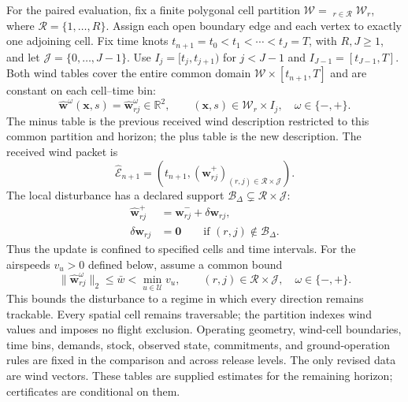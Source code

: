 For the paired evaluation, fix a finite polygonal cell partition
$\mathcal W=\mathop{\dot\bigcup}_{r\in\mathcal R}\mathcal W_r$, where
$\mathcal R=\{1,\ldots,R\}$. Assign each open boundary edge and each vertex
to exactly one adjoining cell. Fix time knots
$t_{n+1}=t_0<t_1<\cdots<t_J=T$, with $R,J\ge1$,
and let $\mathcal J=\{0,\ldots,J-1\}$.
Use $I_j=[t_j,t_{j+1})$ for $j<J-1$ and
$I_{J-1}=[t_{J-1},T]$. Both wind tables cover the entire common domain
$\mathcal W\times[t_{n+1},T]$ and are constant on each cell--time bin:
\begin{equation}
\widehat{\mathbf w}^{\omega}(\mathbf x,s)
=\widehat{\mathbf w}_{rj}^{\omega}\in\mathbb R^2,\qquad
(\mathbf x,s)\in\mathcal W_r\times I_j,\quad \omega\in\{-,+\}.
\label{eq:wind_field}
\end{equation}
The minus table is the previous received wind description restricted to
this common partition and horizon; the plus table is the new description.
The received wind packet is
\begin{equation}
\widehat{\mathcal E}_{n+1}
=\left(t_{n+1},(\widehat{\mathbf w}_{rj}^{+})_
{(r,j)\in\mathcal R\times\mathcal J}\right).
\label{eq:packet}
\end{equation}
The local disturbance has a declared support
$\mathcal B_\Delta\subsetneq\mathcal R\times\mathcal J$:
\begin{equation}
\begin{split}
\widehat{\mathbf w}_{rj}^{+}
&=\widehat{\mathbf w}_{rj}^{-}+\delta\mathbf w_{rj},\\
\delta\mathbf w_{rj}&=\mathbf0\qquad
\text{if }(r,j)\notin\mathcal B_\Delta.
\end{split}
\label{eq:local_wind_update}
\end{equation}
Thus the update is confined to specified cells and time intervals.
For the airspeeds $v_u>0$ defined below, assume a common bound
\begin{equation}
\|\widehat{\mathbf w}_{rj}^{\omega}\|_2\le\bar w<\min_{u\in\mathcal U}v_u,
\qquad (r,j)\in\mathcal R\times\mathcal J,\quad\omega\in\{-,+\}.
\label{eq:wind_bound}
\end{equation}
This bounds the disturbance to a regime in which every direction remains
trackable. Every spatial cell remains traversable; the partition indexes
wind values and imposes no flight exclusion. Operating geometry,
wind-cell boundaries, time bins, demands,
stock, observed state, commitments, and ground-operation rules are fixed in
the comparison and across release levels. The only revised data are wind
vectors. These tables are supplied estimates for the remaining horizon;
certificates are conditional on them.

